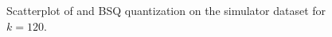 			\begin{figure}[ht]
				\centering
				\caption[Scatterplot of \kmeans{} and BSQ centroids on the EMA dataset]{Scatterplot of \kmeans{} and BSQ quantization on the simulator dataset for $k=120$.}
				\label{fig:ae_fits}
			\end{figure}
			
